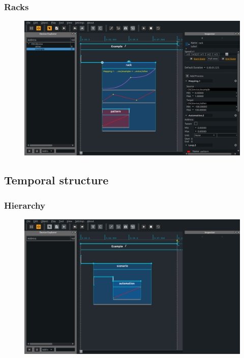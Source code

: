 \documentclass[handout]{beamer}
\begin{document}
\begin{frame}
\frametitle{Racks}
\Large
\begin{figure}
    \includegraphics[width=\textwidth]{images/rack.png}
\end{figure}
\end{frame}

\subsection{Temporal structure}
\begin{frame}
\frametitle{Hierarchy}
\Large
\begin{figure}
    \includegraphics[width=\textwidth]{images/scenario.png}
\end{figure}
\end{frame}
\end{document}
